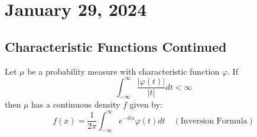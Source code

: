 \newpage
\section{January 29, 2024}
\subsection{Characteristic Functions Continued}
\begin{corollary}
Let \(\mu\) be a probability measure with characteristic function \(\varphi\). If
\[
\int_{-\infty}^{\infty} \frac{|\varphi(t)|}{|t|} dt < \infty
\]
then \(\mu\) has a continuous density \( f \) given by:
\[
f(x) = \frac{1}{2\pi} \int_{-\infty}^{\infty} e^{-itx} \varphi(t) dt \quad (\text{Inversion Formula})
\]
\end{corollary}

